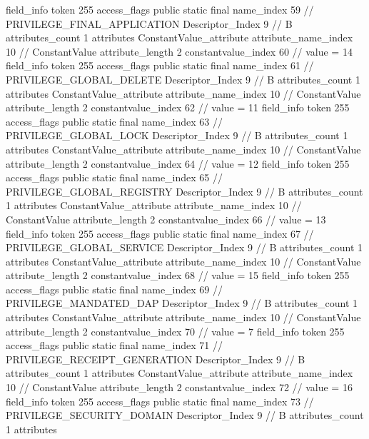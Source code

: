 {{{{{{{				}
				}
			}
			field_info {
				token	255
				access_flags	public static final
				name_index	59		// PRIVILEGE_FINAL_APPLICATION
				Descriptor_Index	9		// B
				attributes_count	1
				attributes {
				ConstantValue_attribute {
					attribute_name_index	10		// ConstantValue
					attribute_length	2
					constantvalue_index	60		// value = 14
				}
				}
			}
			field_info {
				token	255
				access_flags	public static final
				name_index	61		// PRIVILEGE_GLOBAL_DELETE
				Descriptor_Index	9		// B
				attributes_count	1
				attributes {
				ConstantValue_attribute {
					attribute_name_index	10		// ConstantValue
					attribute_length	2
					constantvalue_index	62		// value = 11
				}
				}
			}
			field_info {
				token	255
				access_flags	public static final
				name_index	63		// PRIVILEGE_GLOBAL_LOCK
				Descriptor_Index	9		// B
				attributes_count	1
				attributes {
				ConstantValue_attribute {
					attribute_name_index	10		// ConstantValue
					attribute_length	2
					constantvalue_index	64		// value = 12
				}
				}
			}
			field_info {
				token	255
				access_flags	public static final
				name_index	65		// PRIVILEGE_GLOBAL_REGISTRY
				Descriptor_Index	9		// B
				attributes_count	1
				attributes {
				ConstantValue_attribute {
					attribute_name_index	10		// ConstantValue
					attribute_length	2
					constantvalue_index	66		// value = 13
				}
				}
			}
			field_info {
				token	255
				access_flags	public static final
				name_index	67		// PRIVILEGE_GLOBAL_SERVICE
				Descriptor_Index	9		// B
				attributes_count	1
				attributes {
				ConstantValue_attribute {
					attribute_name_index	10		// ConstantValue
					attribute_length	2
					constantvalue_index	68		// value = 15
				}
				}
			}
			field_info {
				token	255
				access_flags	public static final
				name_index	69		// PRIVILEGE_MANDATED_DAP
				Descriptor_Index	9		// B
				attributes_count	1
				attributes {
				ConstantValue_attribute {
					attribute_name_index	10		// ConstantValue
					attribute_length	2
					constantvalue_index	70		// value = 7
				}
				}
			}
			field_info {
				token	255
				access_flags	public static final
				name_index	71		// PRIVILEGE_RECEIPT_GENERATION
				Descriptor_Index	9		// B
				attributes_count	1
				attributes {
				ConstantValue_attribute {
					attribute_name_index	10		// ConstantValue
					attribute_length	2
					constantvalue_index	72		// value = 16
				}
				}
			}
			field_info {
				token	255
				access_flags	public static final
				name_index	73		// PRIVILEGE_SECURITY_DOMAIN
				Descriptor_Index	9		// B
				attributes_count	1
				attributes {
}}}}}}
